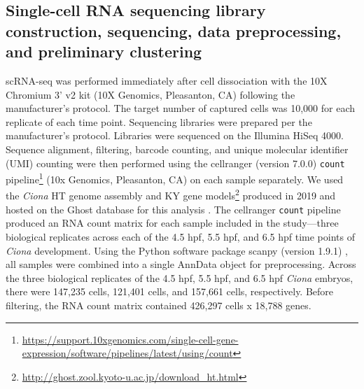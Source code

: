 \subsection{Single-cell RNA sequencing library construction, sequencing, data preprocessing, and preliminary clustering}
scRNA-seq was performed immediately after cell dissociation with the 10X Chromium 3' v2 kit (10X Genomics, Pleasanton, CA) following the manufacturer’s protocol. The target number of captured cells was 10,000 for each replicate of each time point. Sequencing libraries were prepared per the manufacturer’s protocol. Libraries were sequenced on the Illumina HiSeq 4000. Sequence alignment, filtering, barcode counting, and unique molecular identifier (UMI) counting were then performed using the cellranger (version 7.0.0) \verb|count| pipeline\footnote{\href{https://support.10xgenomics.com/single-cell-gene-expression/software/pipelines/latest/using/count}{https://support.10xgenomics.com/single-cell-gene-expression/software/pipelines/latest/using/count}} (10x Genomics, Pleasanton, CA) on each sample separately. We used the \textit{Ciona} HT genome assembly and KY gene models\footnote{\url{http://ghost.zool.kyoto-u.ac.jp/download_ht.html}} produced in 2019 and hosted on the Ghost database for this analysis \cite{satou2019}. The cellranger \verb|count| pipeline produced an RNA count matrix for each sample included in the study—three biological replicates across each of the 4.5 hpf, 5.5 hpf, and 6.5 hpf time points of \textit{Ciona} development. Using the Python software package scanpy (version 1.9.1) \cite{wolf2018}, all samples were combined into a single AnnData object for preprocessing. Across the three biological replicates of the 4.5 hpf, 5.5 hpf, and 6.5 hpf \textit{Ciona} embryos, there were 147,235 cells, 121,401 cells, and 157,661 cells, respectively. Before filtering, the RNA count matrix contained 426,297 cells x 18,788 genes. 

